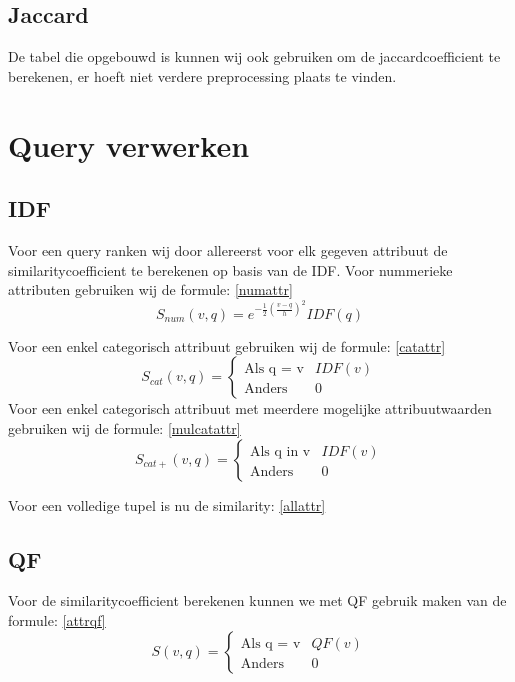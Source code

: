 \documentclass[a4paper]{article}
\begin{document}
\subsection{Jaccard}
De tabel die opgebouwd is kunnen wij ook gebruiken om de jaccardcoefficient te berekenen, er hoeft niet verdere preprocessing plaats te vinden.

\section{Query verwerken}
\subsection{IDF}
Voor een query ranken wij door allereerst voor elk gegeven attribuut de similaritycoefficient te berekenen op basis van de IDF.
Voor nummerieke attributen gebruiken wij de formule: \eqref{numattr}
\begin{equation}
S_{num}(v,q) = e^{-\frac{1}{2}(\frac{v-q}{h})^2} IDF(q)
\label{numattr}
\end{equation}

Voor een enkel categorisch attribuut gebruiken wij de formule: \eqref{catattr}
\begin{equation}
S_{cat}(v,q) = \left\{ \begin{matrix}\mbox{Als q = v}  & IDF(v) \\ \mbox{Anders } & 0 \end{matrix}\right.
\label{catattr}
\end{equation}
Voor een enkel categorisch attribuut met meerdere mogelijke attribuutwaarden gebruiken wij de formule: \eqref{mulcatattr}
\begin{equation}
S_{cat+}(v,q) = \left\{ \begin{matrix}\mbox{Als q in v}  & IDF(v) \\ \mbox{Anders } & 0 \end{matrix}\right.
\label{mulcatattr}
\end{equation}

Voor een volledige tupel is nu de similarity: \eqref{allattr}
\begin{equation}
\label{allattr}
\end{equation}
\subsection{QF}
Voor de similaritycoefficient berekenen kunnen we met QF gebruik maken van de formule: \eqref{attrqf}
\begin{equation}
S(v,q) = \left\{ \begin{matrix}\mbox{Als q = v}  & QF(v) \\ \mbox{Anders } & 0 \end{matrix}\right.
\label{attrqf}
\end{equation}
\end{document}
